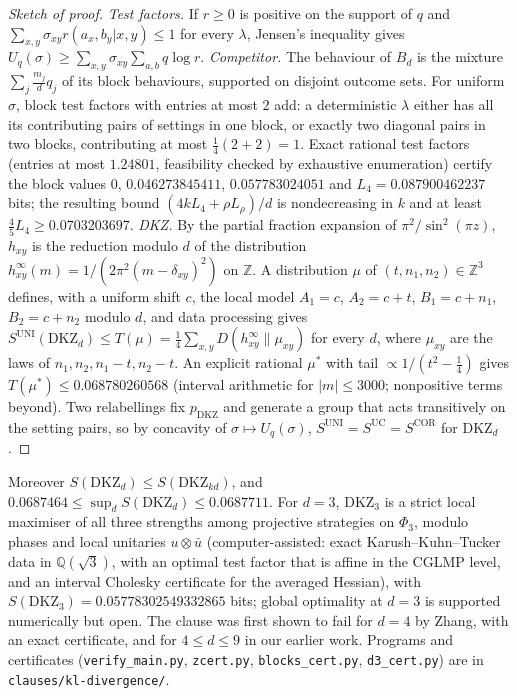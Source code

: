 \documentclass[11pt]{amsart}
\theoremstyle{definition}
\theoremstyle{remark}
\numberwithin{equation}{section}
\newcommand{\Z}{\mathbb{Z}}
\newcommand{\Q}{\mathbb{Q}}
\newcommand{\DKZ}{\mathrm{DKZ}}
\begin{document}
\begin{proof}[Sketch of proof]
\emph{Test factors.} If $r\ge0$ is positive on the support of $q$ and $\sum_{x,y}\sigma_{xy}r(a_x,b_y|x,y)\le1$ for every
$\lambda$, Jensen's inequality gives $U_q(\sigma)\ge\sum_{x,y}\sigma_{xy}\sum_{a,b}q\log r$. \emph{Competitor.} The
behaviour of $B_d$ is the mixture $\sum_j\frac{m_j}dq_j$ of its block behaviours, supported on disjoint outcome sets.
For uniform $\sigma$, block test factors with entries at most $2$ add: a deterministic $\lambda$ either has all its
contributing pairs of settings in one block, or exactly two diagonal pairs in two blocks, contributing at most
$\frac14(2+2)=1$. Exact rational test factors (entries at most $1.24801$, feasibility checked by exhaustive enumeration)
certify the block values $0$, $0.046273845411$, $0.057783024051$ and $L_4=0.087900462237$ bits; the resulting bound
$(4kL_4+\rho L_\rho)/d$ is nondecreasing in $k$ and at least $\frac45L_4\ge0.0703203697$. \emph{DKZ.} By the partial
fraction expansion of $\pi^2/\sin^2(\pi z)$, $h_{xy}$ is the reduction modulo $d$ of the distribution
$h^\infty_{xy}(m)=1/(2\pi^2(m-\delta_{xy})^2)$ on $\Z$. A distribution $\mu$ of $(t,n_1,n_2)\in\Z^3$ defines, with a
uniform shift $c$, the local model $A_1=c$, $A_2=c+t$, $B_1=c+n_1$, $B_2=c+n_2$ modulo $d$, and data processing gives
$S^{\mathrm{UNI}}(\DKZ_d)\le T(\mu)=\frac14\sum_{x,y}D(h^\infty_{xy}\|\mu_{xy})$ for every $d$, where $\mu_{xy}$ are the
laws of $n_1,n_2,n_1-t,n_2-t$. An explicit rational $\mu^*$ with tail $\propto1/(t^2-\frac14)$ gives
$T(\mu^*)\le0.068780260568$ (interval arithmetic for $|m|\le3000$; nonpositive terms beyond). Two relabellings fix
$p_{\DKZ}$ and generate a group that acts transitively on the setting pairs, so by concavity of $\sigma\mapsto U_q(\sigma)$,
$S^{\mathrm{UNI}}=S^{\mathrm{UC}}=S^{\mathrm{COR}}$ for $\DKZ_d$.
\end{proof}

Moreover $S(\DKZ_d)\le S(\DKZ_{kd})$, and $0.0687464\le\sup_dS(\DKZ_d)\le0.0687711$. For $d=3$, $\DKZ_3$ is a strict
local maximiser of all three strengths among projective strategies on $\Phi_3$, modulo phases and local unitaries
$u\otimes\bar u$ (computer-assisted: exact Karush--Kuhn--Tucker data in $\Q(\sqrt3)$, with an optimal test factor that is
affine in the CGLMP level, and an interval Cholesky certificate for the averaged Hessian), with
$S(\DKZ_3)=0.05778302549332865$ bits; global optimality at $d=3$ is supported numerically but open. The clause was
first shown to fail for $d=4$ by Zhang\cite{Zhang}, with an exact certificate, and for $4\le d\le9$ in our earlier
work\cite{repo}. Programs and certificates (\texttt{verify\_main.py}, \texttt{zcert.py}, \texttt{blocks\_cert.py},
\texttt{d3\_cert.py}) are in \texttt{clauses/kl-divergence/}.
\end{document}
